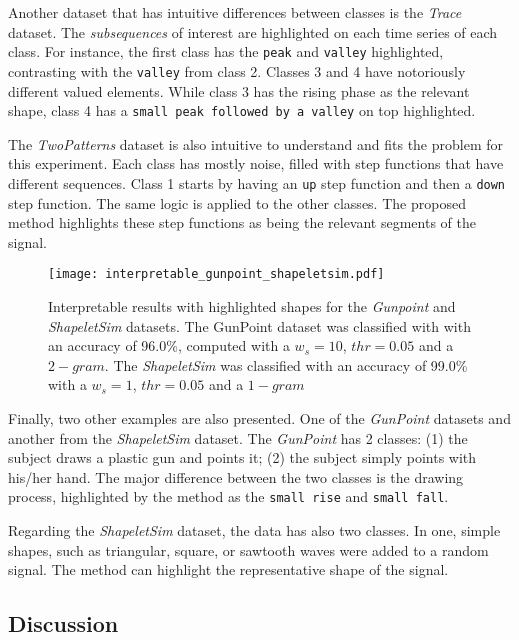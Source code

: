Another dataset that has intuitive differences between classes is the \textit{Trace} dataset. The \textit{subsequences} of interest are highlighted on each time series of each class. For instance, the first class has the \texttt{peak} and \texttt{valley} highlighted, contrasting with the \texttt{valley} from class 2. Classes 3 and 4 have notoriously different valued elements. While class 3 has the rising phase as the relevant shape, class 4 has a \texttt{small peak followed by a valley} on top highlighted.
\par
The \textit{TwoPatterns} dataset is also intuitive to understand and fits the problem for this experiment. Each class has mostly noise, filled with step functions that have different sequences. Class 1 starts by having an \texttt{up} step function and then a \texttt{down} step function. The same logic is applied to the other classes. The proposed method highlights these step functions as being the relevant segments of the signal.

\begin{figure}[h]
    \centering
    \texttt{[image: interpretable\_gunpoint\_shapeletsim.pdf]}
    \caption{Interpretable results with highlighted shapes for the \textit{Gunpoint} and \textit{ShapeletSim} datasets. The GunPoint dataset was classified with with an accuracy of 96.0\%, computed with a $w_s=10$, $thr=0.05$ and a $2-gram$. The \textit{ShapeletSim} was classified with an accuracy of 99.0\% with a $w_s=1$, $thr=0.05$ and a $1-gram$}
    \label{fig:interpretable3}
\end{figure}

Finally, two other examples are also presented. One of the \textit{GunPoint} datasets and another from the \textit{ShapeletSim} dataset. The \textit{GunPoint} has 2 classes: (1) the subject draws a plastic gun and points it; (2) the subject simply points with his/her hand. The major difference between the two classes is the drawing process, highlighted by the method as the \texttt{small rise} and \texttt{small fall}.
\par
Regarding the \textit{ShapeletSim} dataset, the data has also two classes. In one, simple shapes, such as triangular, square, or sawtooth waves were added to a random signal. The method can highlight the representative shape of the signal. 


\subsection{Discussion}
\label{sec:discussion_hearts}


